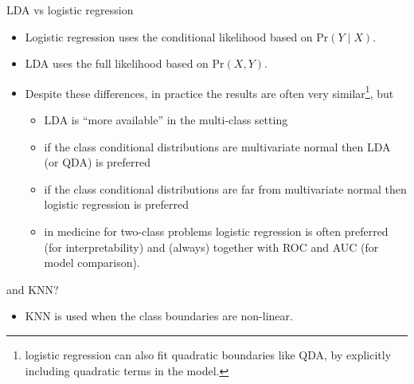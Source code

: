 \documentclass[10pt,ignorenonframetext,]{beamer}
\providecommand{\tightlist}{%
  \setlength{\itemsep}{0pt}\setlength{\parskip}{0pt}}
\begin{document}
\begin{frame}

\begin{block}{LDA vs logistic regression}

\begin{itemize}
\item
  Logistic regression uses the conditional likelihood based on
  \(\text{Pr}(Y \mid X)\).
\item
  LDA uses the full likelihood based on \(\text{Pr}(X,Y)\).
\item
  Despite these differences, in practice the results are often very
  similar\footnote{logistic regression can also fit quadratic boundaries
  like QDA, by explicitly including quadratic terms in the model.}, but

  \begin{itemize}
  \tightlist
  \item
    LDA is ``more available'' in the multi-class setting
  \item
    if the class conditional distributions are multivariate normal then
    LDA (or QDA) is preferred
  \item
    if the class conditional distributions are far from multivariate
    normal then logistic regression is preferred
  \item
    in medicine for two-class problems logistic regression is often
    preferred (for interpretability) and (always) together with ROC and
    AUC (for model comparison).
  \end{itemize}
\end{itemize}

\end{block}

\begin{block}{and KNN?}

\begin{itemize}
\tightlist
\item
  KNN is used when the class boundaries are non-linear.
\end{itemize}

\end{block}

\end{frame}
\end{document}
